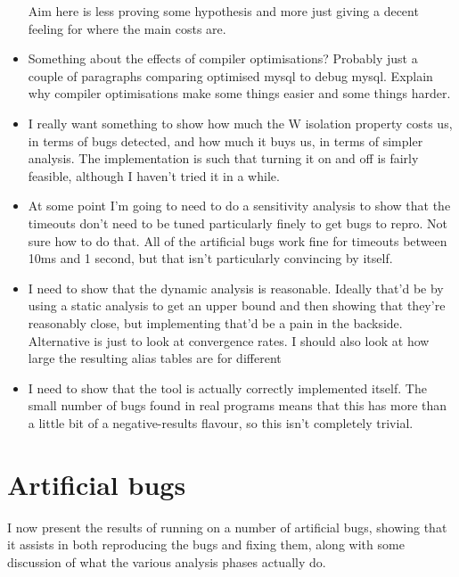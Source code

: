 \begin{itemize}
  Aim here is less proving some hypothesis and more just giving a
  decent feeling for where the main costs are.
\item Something about the effects of compiler optimisations?  Probably
  just a couple of paragraphs comparing optimised mysql to debug
  mysql.  Explain why compiler optimisations make some things easier
  and some things harder.
\item I really want something to show how much the W isolation
  property costs us, in terms of bugs detected, and how much it buys
  us, in terms of simpler analysis.  The implementation is such that
  turning it on and off is fairly feasible, although I haven't tried
  it in a while.

\item At some point I'm going to need to do a sensitivity analysis to
  show that the timeouts don't need to be tuned particularly finely to
  get bugs to repro.  Not sure how to do that.  All of the artificial
  bugs work fine for timeouts between 10ms and 1 second, but that
  isn't particularly convincing by itself.
\item I need to show that the dynamic analysis is reasonable.
  Ideally that'd be by using a static analysis to get an upper bound
  and then showing that they're reasonably close, but implementing
  that'd be a pain in the backside.  Alternative is just to look at
  convergence rates.  I should also look at how large the resulting
  alias tables are for different
\item I need to show that the tool is actually correctly implemented
  itself.  The small number of bugs found in real programs means that
  this has more than a little bit of a negative-results flavour, so
  this isn't completely trivial.
\end{itemize}

\section{Artificial bugs}

I now present the results of running {\implementation} on a number of
artificial bugs, showing that it assists in both reproducing the bugs
and fixing them, along with some discussion of what the various
analysis phases actually do.

